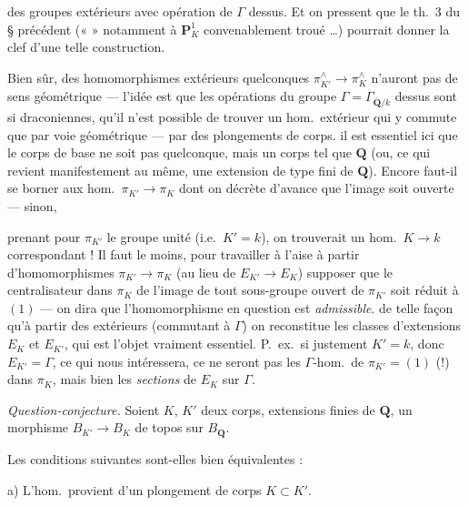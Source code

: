 \documentclass[11pt,a4paper]{article}
\begin{document}
des groupes  extérieurs avec opération de $\Gamma$ dessus. Et on
pressent que le th.~3 du § précédent («  » notamment à
$\mathbf{P}^1_K$ convenablement troué …) pourrait donner la clef d'une telle
construction.

Bien \struck{\ill{}} sûr, des homomorphismes extérieurs quelconques
$\pi^{\wedge}_{K'} \to \pi^{\wedge}_{K}$ n'auront pas de sens géométrique — l'idée
est que les opérations du groupe $\Gamma = \Gamma_{\overline{\mathbf{Q}}/k}$
dessus sont si draconiennes, qu'il n'est possible de trouver un hom.\ extérieur
qui y commute que par voie géométrique — par des plongements de
corps.
 il est essentiel ici que le corps de base ne soit pas
quelconque, mais un corps tel que $\mathbf{Q}$ (ou, ce qui revient manifestement
au même, une extension de type fini de $\mathbf{Q}$). Encore faut-il se borner
aux hom.\ $\pi_{K'} \to \pi_K$ dont on décrète d'avance que l'image soit
ouverte — sinon,

prenant pour $\pi_{K'}$ le groupe unité (i.e.\ $K' = k$), on trouverait un hom.\
$K \to k$ correspondant ! Il faut  le moins, pour travailler à
l'aise à partir d'homomorphismes $\pi_{K'} \to \pi_K$ (au lieu de
$E_{K'} \to E_K$) supposer que le centralisateur dans $\pi_K$ de l'image de tout
sous-groupe ouvert de $\pi_{K'}$ soit réduit à $(1)$ — on dira que
l'homomorphisme en question est \emph{admissible}. \ill{} de telle façon qu'à
partir des \supplied{hom.} extérieurs (commutant à $\Gamma$) on reconstitue les
classes d'extensions $E_K$ et $E_{K'}$, qui est l'objet vraiment essentiel.
P.~ex.\ si justement $K' = k$, donc $E_{K'} = \Gamma$, ce qui nous intéressera,
ce ne seront pas les $\Gamma$-hom.\ de $\pi_{K'} = (1)$ (!) dans $\pi_K$, mais
bien les \emph{sections} de $E_K$ sur $\Gamma$.

\emph{Question-conjecture.} Soient $K$, $K'$ deux corps, extensions 
finies de $\mathbf{Q}$, \struck{considérons} un morphisme $B_{K'} \to B_K$ de
topos sur $B_{\mathbf{Q}}$.

Les conditions suivantes sont-elles bien équivalentes :

a) L'hom.\ provient d'un plongement de corps $K \subset K'$.
\end{document}
